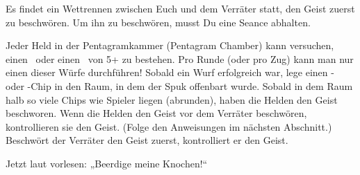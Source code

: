 





Es findet ein Wettrennen zwischen Euch und dem Verräter statt, den Geist zuerst zu beschwören. Um ihn zu beschwören, musst Du eine Seance abhalten.
  \begin{itemize}
        \bitem Jeder Held in der Pentagramkammer (Pentagram Chamber) kann versuchen, einen \knowroll\ oder einen \sanityroll\ von 5+ zu bestehen. Pro Runde (oder pro Zug) kann man nur einen dieser Würfe durchführen!
        \bitem Sobald ein Wurf erfolgreich war, lege einen \know- oder \sanity-Chip in den Raum, in dem der Spuk offenbart wurde. Sobald in dem Raum halb so viele Chips wie Spieler liegen (abrunden), haben die Helden den Geist beschworen.
        \bitem Wenn die Helden den Geist vor dem Verräter beschwören, kontrollieren sie den Geist. (Folge den Anweisungen im nächsten Abschnitt.) Beschwört der Verräter den Geist zuerst, kontrolliert er den Geist.
    \end{itemize}


    Jetzt laut vorlesen: „Beerdige meine Knochen!“

